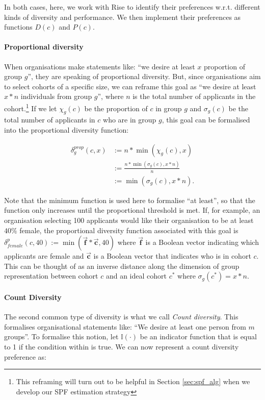 In both cases, here, we work with Rise to identify their preferences w.r.t. different kinds of diversity and performance. We then implement their preferences as functions $D(c)$ and $P(c)$.

\paragraph{Proportional diversity} When organisations make statements like: ``we desire at least $x$ proportion of group $g$'', they are speaking of proportional diversity. But, since organisations aim to select cohorts of a specific size, we can reframe this goal as ``we desire at least $x*n$ individuals from group $g$'', where $n$ is the total number of applicants in the cohort.\footnote{This reframing will turn out to be helpful in Section \ref{sec:spf_alg} when we develop our SPF estimation strategy} If we let $\chi_g(c)$ be the proportion of $c$ in group $g$ and $\sigma_g(c)$ be the total number of applicants in $c$ who are in group $g$, this goal can be formalised into the proportional diversity function:

\begin{equation}
    \begin{split}
        \delta_{g}^{prop}(c,x) &:= n*\min(\chi_g(c), x) \\
        & := \frac{n* \min(\sigma_g(c), x*n)}{n} \\ 
        & := \min(\sigma_g(c), x*n). \label{eq:prop_div_function}
    \end{split}
\end{equation}

Note that the minimum function is used here to formalise ``at least'', so that the function only increases until the proportional threshold is met. If, for example, an organisation selecting 100 applicants would like their organisation to be at least $40\%$ female, the proportional diversity function associated with this goal is $\delta_{female}^p(c, 40) := \min(\vec{\mathbf{f}}*\vec{\mathbf{c}}, 40)$ where $\vec{\mathbf{f}}$ is a Boolean vector indicating which applicants are female and $\vec{\mathbf{c}}$ is a Boolean vector that indicates who is in cohort $c$. This can be thought of as an inverse distance along the dimension of group representation between cohort $c$ and an ideal cohort $c^*$ where $\sigma_g(c^*) = x*n$.

\paragraph{Count Diversity} The second common type of diversity is what we call \emph{Count diversity}. This formalises organisational statements like: ``We desire at least one person from $m$ groups''. To formalise this notion, let $\mathbb{I}(\cdot)$ be an indicator function that is equal to 1 if the condition within is true. We can now represent a count diversity preference as:

